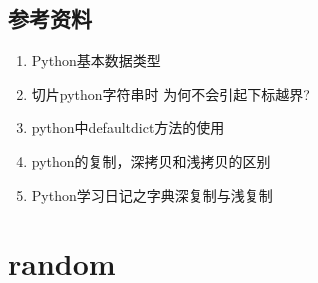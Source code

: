 \documentclass[letterpaper,10pt,english]{sphinxmanual}
\begin{document}
\subsection{参考资料}
\label{\detokenize{python/08_basicType:id5}}\begin{enumerate}
\item {} 
Python基本数据类型

\end{enumerate}
\begin{quote}

\end{quote}
\begin{enumerate}
\setcounter{enumi}{1}
\item {} 
切片python字符串时 为何不会引起下标越界?

\end{enumerate}
\begin{quote}

\end{quote}
\begin{enumerate}
\setcounter{enumi}{2}
\item {} 
python中defaultdict方法的使用

\end{enumerate}
\begin{quote}

\end{quote}
\begin{enumerate}
\setcounter{enumi}{3}
\item {} 
python的复制，深拷贝和浅拷贝的区别

\end{enumerate}
\begin{quote}

\end{quote}
\begin{enumerate}
\setcounter{enumi}{4}
\item {} 
Python学习日记之字典深复制与浅复制

\end{enumerate}
\begin{quote}

\end{quote}


\section{random}
\label{\detokenize{python/09_random:random}}\label{\detokenize{python/09_random::doc}}
\end{document}
